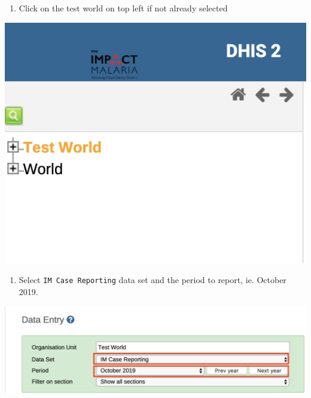 \documentclass[]{book}
\providecommand{\tightlist}{%
  \setlength{\itemsep}{0pt}\setlength{\parskip}{0pt}}
\begin{document}
\begin{enumerate}
\def\labelenumi{\arabic{enumi}.}
\setcounter{enumi}{2}
\tightlist
\item
  Click on the test world on top left if not already selected
\end{enumerate}

\includegraphics[width=6.58in]{./images/test-world}

\begin{enumerate}
\def\labelenumi{\arabic{enumi}.}
\setcounter{enumi}{3}
\tightlist
\item
  Select \texttt{IM\ Case\ Reporting} data set and the period to report, ie. October 2019.
\end{enumerate}

\includegraphics[width=17.36in]{./images/im-reporting}
\end{document}
